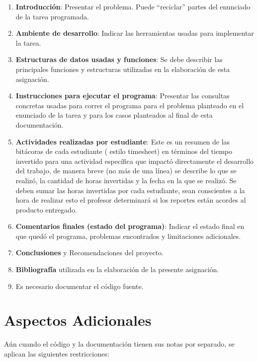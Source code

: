 \documentclass[11pt,a4paper]{scrartcl}			%
\providecommand{\tightlist}{%
          \setlength{\itemsep}{0pt}\setlength{\parskip}{0pt}}
\begin{document}
\begin{multicols*}{2}
\begin{enumerate}
\def\labelenumi{\arabic{enumi}.}
\tightlist
\item
  \textbf{Introducción}: Presentar el problema. Puede ``reciclar''
  partes del enunciado de la tarea programada.
\item
  \textbf{Ambiente de desarrollo}: Indicar las herramientas usadas para
  implementar la tarea.
\item
  \textbf{Estructuras de datos usadas y funciones}: Se debe describir
  las principales funciones y estructuras utilizadas en la elaboración
  de esta asignación.
\item
  \textbf{Instrucciones para ejecutar el programa}: Presentar las
  consultas concretas usadas para correr el programa para el problema
  planteado en el enunciado de la tarea y para los casos planteados al
  final de esta documentación.
\item
  \textbf{Actividades realizadas por estudiante}: Este es un resumen de
  las bitácoras de cada estudiante ( estilo timesheet) en términos del
  tiempo invertido para una actividad específica que impactó
  directamente el desarrollo del trabajo, de manera breve (no más de una
  línea) se describe lo que se realizó, la cantidad de horas invertidas
  y la fecha en la que se realizó. Se deben sumar las horas invertidas
  por cada estudiante, sean conscientes a la hora de realizar esto el
  profesor determinará si los reportes están acordes al producto
  entregado.
\item
  \textbf{Comentarios finales (estado del programa)}: Indicar el estado
  final en que quedó el programa, problemas encontrados y limitaciones
  adicionales.
\item
  \textbf{Conclusiones} y Recomendaciones del proyecto.
\item
  \textbf{Bibliografía} utilizada en la elaboración de la presente
  asignación.
\item
  Es necesario documentar el código fuente.
\end{enumerate}

\section{Aspectos Adicionales}\label{aspectos-adicionales}

Aún cuando el código y la documentación tienen sus notas por separado,
se aplican las siguientes restricciones:


\end{multicols*}
\end{document}
